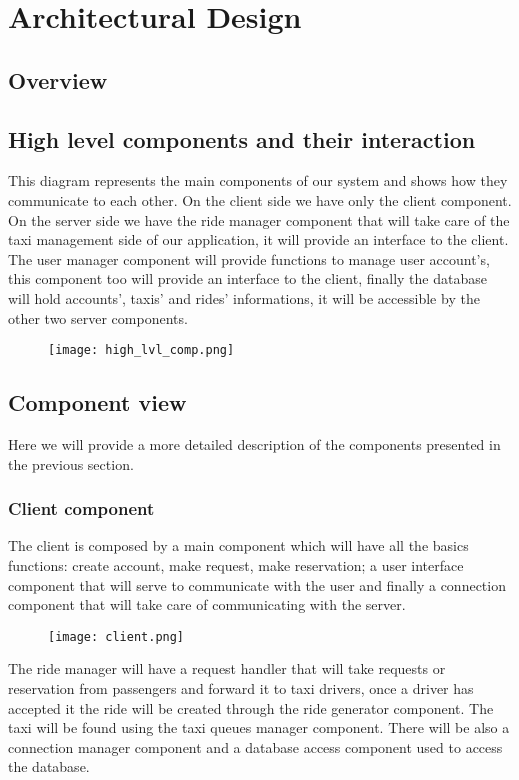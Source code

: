 \section{Architectural Design}

\subsection{Overview}

\subsection{High level components and their interaction}
	This diagram represents the main components of our system and shows how they communicate to each other. On the client side we have only the client component. 
	On the server side we have the ride manager component that will take care of the taxi management side of our application, it will provide an interface to the client. The user manager component will provide functions to manage user account's, this component too will provide an interface to the client, finally the database will hold accounts', taxis' and rides' informations, it will be accessible by the other two server components.
	\begin{figure}[h!]
		\centering
		\texttt{[image: high\_lvl\_comp.png]}
	\end{figure}
	\newpage
	
\subsection{Component view}
	Here we will provide a more detailed description of the components presented in the previous section.
	\subsubsection{Client component}
	The client is composed by a main component which will have all the basics functions: create account, make request, make reservation; a user interface component that will serve to communicate with the user and finally a connection component that will take care of communicating with the server.
		\begin{figure}[h!]
			\centering
			\texttt{[image: client.png]}
		\end{figure}
		\newpage
	The ride manager will have a request handler that will take requests or reservation from passengers and forward it to taxi drivers, once a driver has accepted it the ride will be created through the ride generator component. The taxi will be found using the taxi queues manager component. There will be also a connection manager component and a database access component used to access the database.
